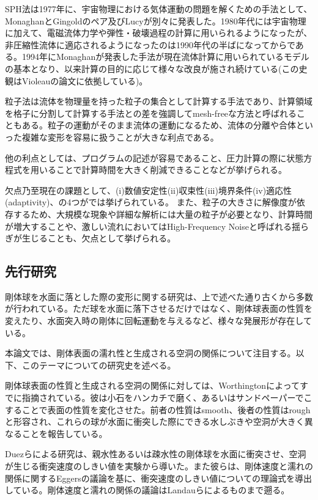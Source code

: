 \documentclass[]{jsarticle}
\begin{document}
SPH法は1977年に、宇宙物理における気体運動の問題を解くための手法として、MonaghanとGingoldのペア\cite{Gingold1977}及びLucy\cite{Lucy1977}が別々に発表した。1980年代には宇宙物理に加えて、電磁流体力学や弾性・破壊過程の計算に用いられるようになったが、非圧縮性流体に適応されるようになったのは1990年代の半ばになってからである。1994年にMonaghan\cite{Monaghan1994}が発表した手法が現在流体計算に用いられているモデルの基本となり、以来計算の目的に応じて様々な改良が施され続けている(この史観はVioleau\cite{Violeau2016}の論文に依拠している)。

粒子法は流体を物理量を持った粒子の集合として計算する手法であり、計算領域を格子に分割して計算する手法との差を強調してmesh-freeな方法と呼ばれることもある。粒子の運動がそのまま流体の運動になるため、流体の分離や合体といった複雑な変形を容易に扱うことが大きな利点である。

他の利点としては、プログラムの記述が容易であること、圧力計算の際に状態方程式を用いることで計算時間を大きく削減できることなどが挙げられる。

欠点乃至現在の課題として、(i)数値安定性(ii)収束性(iii)境界条件(iv)適応性(adaptivity)、の4つが\cite{Violeau2016}では挙げられている。
また、粒子の大きさに解像度が依存するため、大規模な現象や詳細な解析には大量の粒子が必要となり、計算時間が増大することや、激しい流れにおいてはHigh-Frequency Noiseと呼ばれる揺らぎが生じることも、欠点として挙げられる。

\subsection{先行研究}
剛体球を水面に落とした際の変形に関する研究は、上で述べた通り古くから多数が行われている。ただ球を水面に落下させるだけではなく、剛体球表面の性質を変えたり、水面突入時の剛体に回転運動を与えるなど、様々な発展形が存在している。

本論文では、剛体表面の濡れ性と生成される空洞の関係について注目する。以下、このテーマについての研究史を述べる。

剛体球表面の性質と生成される空洞の関係に対しては、Worthingtonによってすでに指摘されている\cite{Worthington1908}。彼は小石をハンカチで磨く、あるいはサンドペーパーでこすることで表面の性質を変化させた。前者の性質はsmooth、後者の性質はroughと形容され、これらの球が水面に衝突した際にできる水しぶきや空洞が大きく異なることを報告している。

Duez\cite{Duez2007}らによる研究は、親水性あるいは疎水性の剛体球を水面に衝突させ、空洞が生じる衝突速度のしきい値を実験から導いた。また彼らは、剛体速度と濡れの関係に関するEggers\cite{Eggers2004}の議論を基に、衝突速度のしきい値についての理論式を導出している。剛体速度と濡れの関係の議論はLandau\cite{landau1942}らによるものまで遡る。
\end{document}

